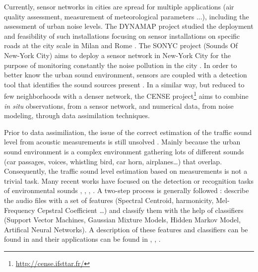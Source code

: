 \documentclass[twocolumn]{svjour3}          %
\begin{document}
Currently, sensor networks in cities are spread for multiple applications (air quality assessment, measurement of meteorological parameters ...), including the assessment of urban noise levels. The DYNAMAP project \cite{dynamap_2016} studied the deployment and feasibility of such installations focusing on sensor installations on specific roads at the city scale in Milan and Rome \cite{bellucci_life_2017}.
The SONYC project (Sounds Of New-York City) aims to deploy a sensor network in New-York City for the purpose of monitoring constantly the noise pollution in the city \cite{mydlarz2017implementation}. In order to better know the urban sound environment, sensors are coupled with a detection tool that identifies the sound sources present \cite{salamon2017deep}. In a similar way, but reduced to few neighborhoods with a denser network, the CENSE project\footnote{\url{http://cense.ifsttar.fr/}} \cite{picaut2017characterization} aims to combine \textit{in situ} observations, from a sensor network, and numerical data, from noise modeling, through data assimilation techniques.

Prior to data assimiliation, the issue of the correct estimation of the traffic sound level from acoustic measurements is still unsolved \cite{Mioduszewski}. Mainly because the urban sound environment is a complex environment gathering lots of different sounds (car passages, voices, whistling bird, car horn, airplanes\dots) that overlap. Consequently, the traffic sound level estimation based on measurements is not a trivial task.
Many recent works have focused on the detection or recognition tasks of environmental sounds \cite{heittola_sound_2011}, \cite{defreville_automatic_2006}, \cite{dufaux_automatic_2000}, \cite{chu_environmental_2009}. A two-step process is generally followed : describe the audio files with a set of features (Spectral Centroid, harmonicity, Mel-Frequency Cepstral Coefficient \dots) and classify them with the help of classifiers (Support Vector Machines, Gaussian Mixture Models, Hidden Markov Model, Artifical Neural Networks). A description of these features and classifiers can be found in \cite{cowling_comparison_2003} and their applications can be found in \cite{shen_environmental_2012}, \cite{beritelli_pattern_2008}, \cite{couvreur_automatic_2004}.
\end{document}
